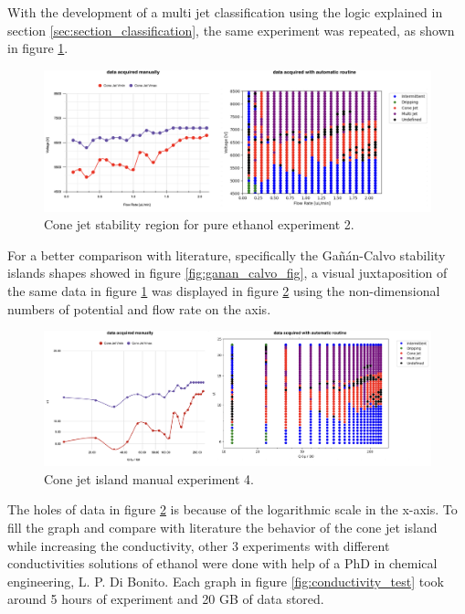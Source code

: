     With the development of a multi jet classification using the logic explained in section \ref{sec:section_classification}, the same experiment was repeated, as shown in figure \ref{fig:stability_6}.

        \begin{figure}[H]
            \center
            \includegraphics[width=18cm]{Figuras/april/map_third.png}
            \caption{Cone jet stability region for pure ethanol experiment 2.}
            \label{fig:stability_6}
        \end{figure}

    For a better comparison with literature, specifically the Gañán-Calvo\cite{gananCalvo} stability islands shapes showed in figure \ref{fig:ganan_calvo_fig}, a visual juxtaposition of the same data in figure \ref{fig:stability_6} was displayed in figure \ref{fig:stability_8} using the non-dimensional numbers of potential and flow rate on the axis.

        \begin{figure}[H]
            \center
            \includegraphics[width=18cm]{Figuras/april/manual_au_1.png}
            \caption{Cone jet island manual experiment 4.}
            \label{fig:stability_8}
        \end{figure}

        The holes of data in figure \ref{fig:stability_8} is because of the logarithmic scale in the x-axis. 
        To fill the graph and compare with literature the behavior of the cone jet island while increasing the conductivity, other 3 experiments with different conductivities solutions of ethanol were done with help of a PhD in chemical engineering, L. P. Di Bonito.
        Each graph in figure \ref{fig:conductivity_test} took around 5 hours of experiment and 20 GB of data stored. 
        

